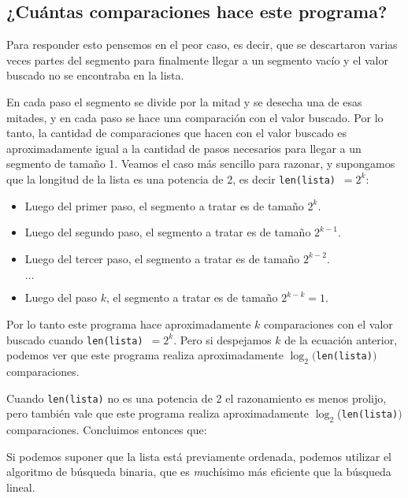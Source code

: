 
\subsection*{¿Cuántas comparaciones hace este programa?}

Para responder esto pensemos en el peor caso, es decir, que se descartaron
varias veces partes del segmento para finalmente llegar a un segmento vacío y
el valor buscado no se encontraba en la lista.

En cada paso el segmento se divide por la mitad y se desecha una de esas
mitades, y en cada paso se hace una comparación con el valor buscado. Por lo
tanto, la cantidad de comparaciones que hacen con el valor buscado es
aproximadamente igual a la cantidad de pasos necesarios para llegar a un
segmento de tamaño 1.
Veamos el caso más sencillo para razonar, y supongamos que la longitud de la
lista es una potencia de 2, es decir \lstinline+len(lista)+~$= 2^k$:

\begin{itemize}
\item Luego del primer paso, el segmento a tratar es de tamaño $2^k$.
\item Luego del segundo paso, el segmento a tratar es de tamaño $2^{k-1}$.
\item Luego del tercer paso, el segmento a tratar es de tamaño $2^{k-2}$.

$\ldots$

\item Luego del paso $k$, el segmento a tratar es de tamaño $2^{k-k}=1$.
\end{itemize}

Por lo tanto este programa hace aproximadamente $k$ comparaciones con el valor
buscado cuando \lstinline+len(lista)+~$= 2^k$.
Pero si despejamos $k$ de la ecuación anterior, podemos ver que este programa
realiza aproximadamente $\log_2($\lstinline+len(lista)+$)$ comparaciones.

Cuando \lstinline+len(lista)+ no es una potencia de 2 el razonamiento es menos
prolijo, pero también vale que este programa realiza aproximadamente
$\log_2$(\lstinline+len(lista)+$)$ comparaciones. Concluimos entonces que:

\begin{observacion}
Si podemos suponer que la lista está previamente ordenada, podemos utilizar el
algoritmo de búsqueda binaria, que es {\emph muchísimo} más eficiente que la
búsqueda lineal.
\end{observacion}

